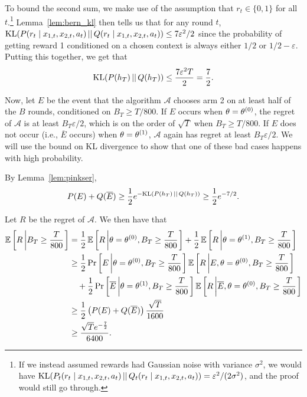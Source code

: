 To bound the second sum, we make use of the assumption that
$r_t \in \{0,1\}$ for all $t$.\footnote{If we instead assumed rewards
  had Gaussian noise with variance $\sigma^2$, we would have
  $\text{KL}(P_t(r_t \;|\; x_{1,t}, x_{2,t}, a_t) \, ||\, Q_t(r_t \;|\; x_{1,t}, x_{2,t}, a_t)) =
  \varepsilon^2/(2\sigma^2)$, and the proof would
  still go through.} Lemma~\ref{lem:bern_kl} then tells us that for
any round $t$,
$\text{KL}(P(r_t \;|\; x_{1,t}, x_{2,t}, a_t) \, ||\, Q(r_t \;|\; x_{1,t}, x_{2,t}, a_t)) \le 7 \varepsilon^2/2$
since the probability of getting reward 1 conditioned on a chosen
context is always either $1/2$ or $1/2 - \varepsilon$. Putting this
together, we get that \[
  \text{KL}(P(h_T) \, ||\, Q(h_T)) \le \frac{7\varepsilon^2 T}{2} = \frac{7}{2}.
\]

Now, let $E$ be the event that the algorithm $\mathcal{A}$ chooses arm
2 on at least half of the $B$ rounds, conditioned on $B_T \ge T/800$. If $E$ occurs when
$\theta = \theta^{(0)}$, the regret of $\mathcal{A}$ is at least
$B_T \varepsilon / 2$, which is on the order of $\sqrt{T}$ when
$B_T \geq T /800$. If $E$ does not occur (i.e., $\overline{E}$ occurs)
when $\theta = \theta^{(1)}$, $\mathcal{A}$ again has regret at least
$B_T \varepsilon / 2$. We will use the bound on KL
divergence to show that one of these bad cases happens with high
probability.

By Lemma~\ref{lem:pinkser},
\[
  P(E) + Q(\overline{E}) \ge \frac{1}{2} e^{-\text{KL}(P(h_T) \, ||\, Q(h_T))} \geq
  \frac{1}{2} e^{-7/2}.
\]

Let $R$ be the regret of $\mathcal{A}$.  We then have that
\begin{align*}
\operatorname{\mathbb{E}}\left[R \left\vert B_T \geq \frac{T}{800}\right. \right] &= \frac{1}{2} \operatorname{\mathbb{E}}\left[R \left\vert \theta = \theta^{(0)}, B_T \geq \frac{T}{800}\right. \right]
+ \frac{1}{2} \operatorname{\mathbb{E}}\left[R \left\vert \theta = \theta^{(1)}, B_T \geq \frac{T}{800}\right. \right] \\
&\geq \frac{1}{2} \Pr\left[E \left\vert \theta = \theta^{(0)}, B_T \geq \frac{T}{800}\right. \right]
  \operatorname{\mathbb{E}}\left[R \left\vert E, \theta = \theta^{(0)}, B_T \geq \frac{T}{800}\right. \right] \\
& \quad + \frac{1}{2} \Pr\left[\overline{E} \left\vert \theta = \theta^{(1)}, B_T \geq \frac{T}{800}\right. \right]
  \operatorname{\mathbb{E}}\left[R \left\vert \overline{E}, \theta = \theta^{(0)}, B_T \geq \frac{T}{800}\right. \right] \\
&\geq \frac{1}{2} \left(P(E) + Q(\overline{E})\right) \frac{\sqrt{T}}{1600} \\
&\geq \frac{\sqrt T e^{-\frac{7}{2}}}{6400}.
\end{align*}

